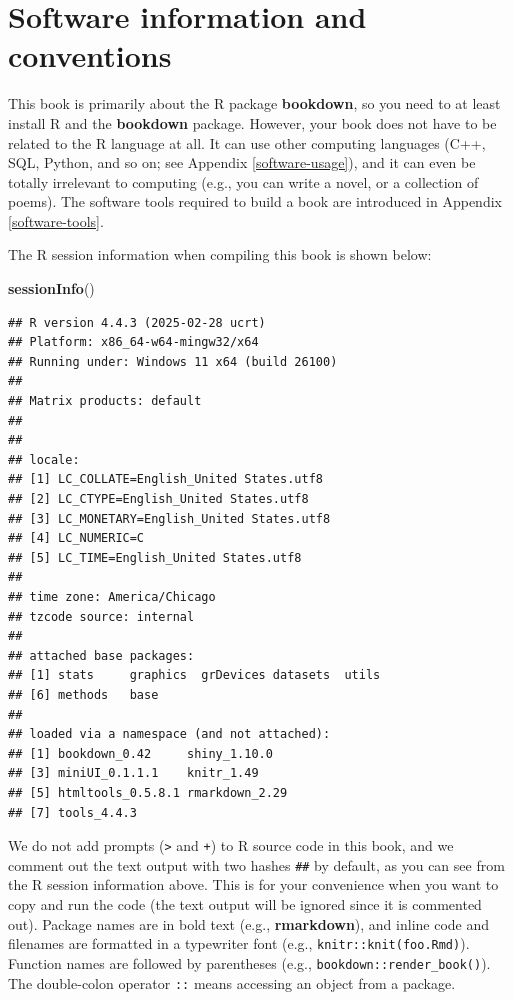 \documentclass[
  10pt,
]{krantz}
\newenvironment{Shaded}{\begin{snugshade}}{\end{snugshade}}
\newcommand{\FunctionTok}[1]{\textcolor[rgb]{0.13,0.29,0.53}{\textbf{#1}}}
\newcommand{\NormalTok}[1]{#1}
\begin{document}
\section*{Software information and conventions}\label{software-information-and-conventions}


This book is primarily about the R package \textbf{bookdown}, so you need to at least install R and the \textbf{bookdown} package. However, your book does not have to be related to the R language at all. It can use other computing languages (C++, SQL, Python, and so on; see Appendix \ref{software-usage}), and it can even be totally irrelevant to computing (e.g., you can write a novel, or a collection of poems). The software tools required to build a book are introduced in Appendix \ref{software-tools}.

The R session information when compiling this book is shown below:

\begin{Shaded}
\begin{Highlighting}[]
\FunctionTok{sessionInfo}\NormalTok{()}
\end{Highlighting}
\end{Shaded}

\begin{verbatim}
## R version 4.4.3 (2025-02-28 ucrt)
## Platform: x86_64-w64-mingw32/x64
## Running under: Windows 11 x64 (build 26100)
## 
## Matrix products: default
## 
## 
## locale:
## [1] LC_COLLATE=English_United States.utf8 
## [2] LC_CTYPE=English_United States.utf8   
## [3] LC_MONETARY=English_United States.utf8
## [4] LC_NUMERIC=C                          
## [5] LC_TIME=English_United States.utf8    
## 
## time zone: America/Chicago
## tzcode source: internal
## 
## attached base packages:
## [1] stats     graphics  grDevices datasets  utils    
## [6] methods   base     
## 
## loaded via a namespace (and not attached):
## [1] bookdown_0.42     shiny_1.10.0     
## [3] miniUI_0.1.1.1    knitr_1.49       
## [5] htmltools_0.5.8.1 rmarkdown_2.29   
## [7] tools_4.4.3
\end{verbatim}

We do not add prompts (\texttt{\textgreater{}} and \texttt{+}) to R source code in this book, and we comment out the text output with two hashes \texttt{\#\#} by default, as you can see from the R session information above. This is for your convenience when you want to copy and run the code (the text output will be ignored since it is commented out). Package names are in bold text (e.g., \textbf{rmarkdown}), and inline code and filenames are formatted in a typewriter font (e.g., \texttt{knitr::knit(\textquotesingle{}foo.Rmd\textquotesingle{})}). Function names are followed by parentheses (e.g., \texttt{bookdown::render\_book()}). The double-colon operator \texttt{::} means accessing an object from a package.
\end{document}
